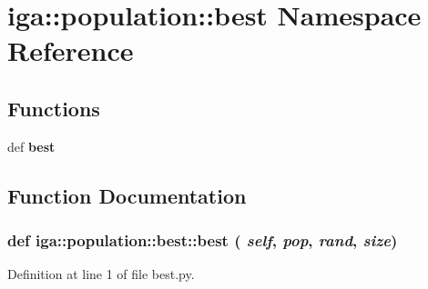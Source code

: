 \section{iga::population::best Namespace Reference}
\label{namespaceiga_1_1population_1_1best}


\subsection*{Functions}
\begin{CompactItemize}
\item 
def {\bf best}
\end{CompactItemize}


\subsection{Function Documentation}
\subsubsection{\setlength{\rightskip}{0pt plus 5cm}def iga::population::best::best ( {\em self},  {\em pop},  {\em rand},  {\em size})}\label{namespaceiga_1_1population_1_1best_7e09c849d84846741a7cab083fd464a6}




Definition at line 1 of file best.py.